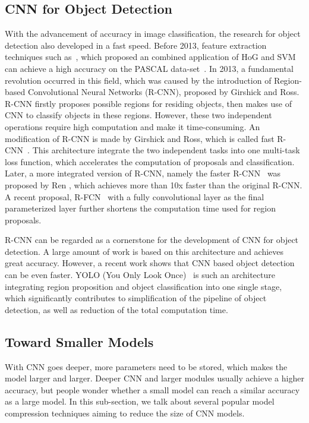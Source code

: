 \documentclass[10pt,twocolumn,letterpaper]{article}
\begin{document}
\subsection{CNN for Object Detection}
With the advancement of accuracy in image classification, the research for object detection also developed in a fast speed. Before 2013, feature extraction techniques such as~\cite{dalal2005histograms}, which proposed an combined application of HoG and SVM can achieve a high accuracy on the PASCAL data-set~\cite{everingham2010pascal}. In 2013, a fundamental revolution occurred in this field, which was caused by the introduction of Region-based Convolutional Neural Networks (R-CNN), proposed by Girshick and Ross. R-CNN firstly proposes possible regions for residing objects, then makes use of CNN to classify objects in these regions. However, these two independent operations require high computation and make it time-consuming. An modification of R-CNN is made by Girshick and Ross, which is called fast R-CNN~\cite{girshick2015fast}. This architecture integrate the two independent tasks into one multi-task loss function, which accelerates the computation of proposals and classification. Later, a more integrated version of R-CNN, namely the faster R-CNN~\cite{ren1506towards} was proposed by Ren \etal, which achieves more than 10x faster than the original R-CNN. A recent proposal, R-FCN~\cite{li2016r} with a fully convolutional layer as the final parameterized layer further shortens the computation time used for region proposals. 

R-CNN can be regarded as a cornerstone for the development of CNN for object detection. A large amount of work is based on this architecture and achieves great accuracy. However, a recent work shows that CNN based object detection can be even faster. YOLO (You Only Look Once)~\cite{redmon2016you} is such an architecture integrating region proposition and object classification into one single stage, which significantly contributes to simplification of the pipeline of object detection, as well as reduction of the total computation time.

\subsection{Toward Smaller Models}
With CNN goes deeper, more parameters need to be stored, which makes the model larger and larger. Deeper CNN and larger modules usually achieve a higher accuracy, but people wonder whether a small model can reach a similar accuracy as a large model. In this sub-section, we talk about several popular model compression techniques aiming to reduce the size of CNN models.
\end{document}
